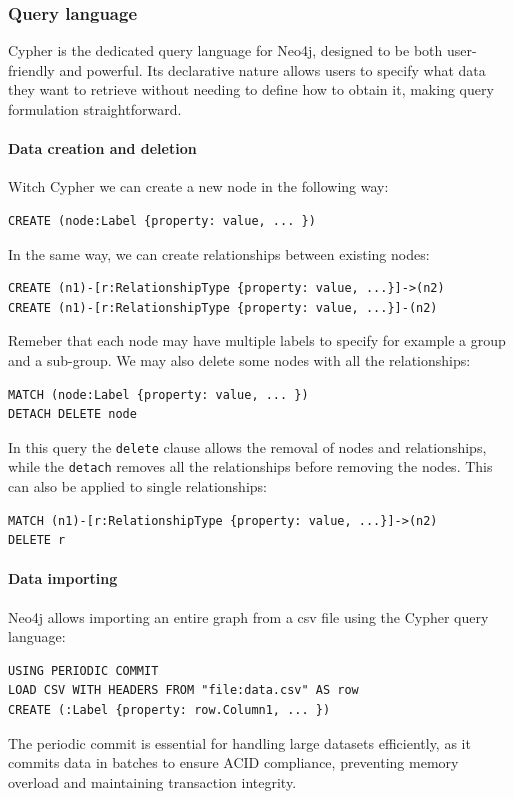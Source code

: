 \subsubsection{Query language}
Cypher is the dedicated query language for Neo4j, designed to be both user-friendly and powerful. 
Its declarative nature allows users to specify what data they want to retrieve without needing to define how to obtain it, making query formulation straightforward.

\paragraph*{Data creation and deletion}
Witch Cypher we can create a new node in the following way: 
\begin{lstlisting}[style=Cypher]
CREATE (node:Label {property: value, ... })
\end{lstlisting}
In the same way, we can create relationships between existing nodes: 
\begin{lstlisting}[style=Cypher]
CREATE (n1)-[r:RelationshipType {property: value, ...}]->(n2)
CREATE (n1)-[r:RelationshipType {property: value, ...}]-(n2)
\end{lstlisting}
Remeber that each node may have multiple labels to specify for example a group and a sub-group. 
We may also delete some nodes with all the relationships: 
\begin{lstlisting}[style=Cypher]
MATCH (node:Label {property: value, ... }) 
DETACH DELETE node
\end{lstlisting}
In this query the \texttt{delete} clause allows the removal of nodes and relationships, while the \texttt{detach} removes all the relationships before removing the nodes.
This can also be applied to single relationships: 
\begin{lstlisting}[style=Cypher]
MATCH (n1)-[r:RelationshipType {property: value, ...}]->(n2)
DELETE r
\end{lstlisting}

\paragraph*{Data importing}
Neo4j allows importing an entire graph from a csv file using the Cypher query language:
\begin{lstlisting}[style=Cypher]
USING PERIODIC COMMIT 
LOAD CSV WITH HEADERS FROM "file:data.csv" AS row
CREATE (:Label {property: row.Column1, ... })
\end{lstlisting}
The periodic commit is essential for handling large datasets efficiently, as it commits data in batches to ensure ACID compliance, preventing memory overload and maintaining transaction integrity.

